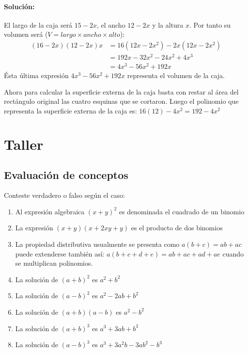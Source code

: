 \documentclass[10pt,twoside]{article}
\begin{document}
\paragraph*{Solución:}

El largo de la caja será $15-2x$, el ancho $12-2x$ y la altura $x$. Por tanto su volumen será ($V=largo\times ancho \times alto$):
\begin{align*}
(16-2x)(12-2x)x&=16(12x-2x^2)-2x(12x-2x^2)\\
&=192x-32x^2-24x^2+4x^3\\
&=4x^3-56x^2+192x
\end{align*}
Ésta última expresión $4x^3-56x^2+192x$ representa el volumen de la caja.

Ahora para calcular la superficie externa de la caja basta con restar al área del rectángulo original las cuatro esquinas que se cortaron. Luego el polinomio que representa la superficie externa de la caja es: 
$16(12)-4x^2=192-4x^2$
\section*{Taller}
\subsection*{Evaluaci\'{o}n de conceptos}
Conteste verdadero o falso seg\'{u}n el caso:
\begin{enumerate}
\item Al expresi\'{o}n algebraica $(x+y)^{2}$ es denominada el cuadrado de un binomio
\item La expresi\'{o}n $(x+y)(x+2xy+y)$ es el producto de dos binomios
\item La propiedad distributiva usualmente se presenta como $a(b+c)=ab+ac$ puede extenderse también así: $a(b+c+d+e)=ab+ac+ad+ae$ cuando se multiplican polinomios.
\item La solución de $(a+b)^2$ es $a^2+b^2$
\item La solución de $(a-b)^2$ es $a^2-2ab+b^2$
\item La soluci\'{o}n de $(a+b)(a-b)$ es $a^{2}-b^{2}$
\item La soluci\'{o}n de $(a+b)^{3}$ es $a^{3}+3ab+b^{3}$
\item La soluci\'{o}n de $(a-b)^{3}$ es $a^{3}+3a^{2}b-3ab^{2}-b^{3}$
\end{enumerate}
\end{document}

